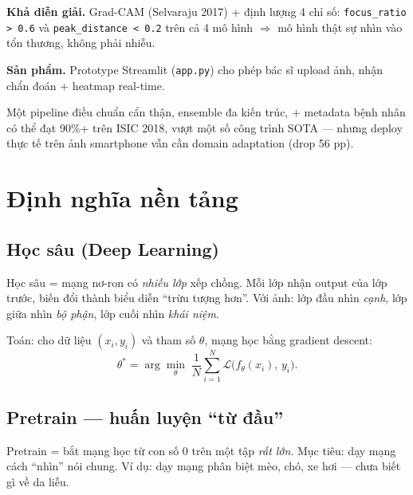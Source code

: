 \documentclass[11pt,a4paper]{article}
\begin{document}
\textbf{Khả diễn giải.} Grad-CAM (Selvaraju 2017) + định lượng 4 chỉ số: \texttt{focus\_ratio > 0.6} và \texttt{peak\_distance < 0.2} trên cả 4 mô hình $\Rightarrow$ mô hình thật sự nhìn vào tổn thương, không phải nhiễu.

\textbf{Sản phẩm.} Prototype Streamlit (\texttt{app.py}) cho phép bác sĩ upload ảnh, nhận chẩn đoán $+$ heatmap real-time.

\begin{idea}
Một pipeline điều chuẩn cẩn thận, ensemble đa kiến trúc, $+$ metadata bệnh nhân có thể đạt 90\%+ trên ISIC 2018, vượt một số công trình SOTA --- nhưng deploy thực tế trên ảnh smartphone vẫn cần domain adaptation (drop 56 pp).
\end{idea}

\section{Định nghĩa nền tảng}

\subsection{Học sâu (Deep Learning)}

\begin{simple}
Học sâu = mạng nơ-ron có \textit{nhiều lớp} xếp chồng. Mỗi lớp nhận output của lớp trước, biến đổi thành biểu diễn ``trừu tượng hơn''. Với ảnh: lớp đầu nhìn \textit{cạnh}, lớp giữa nhìn \textit{bộ phận}, lớp cuối nhìn \textit{khái niệm}.
\end{simple}

Toán: cho dữ liệu $(x_i, y_i)$ và tham số $\theta$, mạng học bằng gradient descent:
\[
  \theta^* = \arg\min_\theta \; \frac{1}{N}\sum_{i=1}^N \mathcal{L}\bigl(f_\theta(x_i),\, y_i\bigr).
\]

\subsection{Pretrain --- huấn luyện ``từ đầu''}

\begin{simple}
Pretrain = bắt mạng học từ con số 0 trên một tập \textit{rất lớn}. Mục tiêu: dạy mạng cách ``nhìn'' nói chung. Ví dụ: dạy mạng phân biệt mèo, chó, xe hơi --- chưa biết gì về da liễu.
\end{simple}
\end{document}
